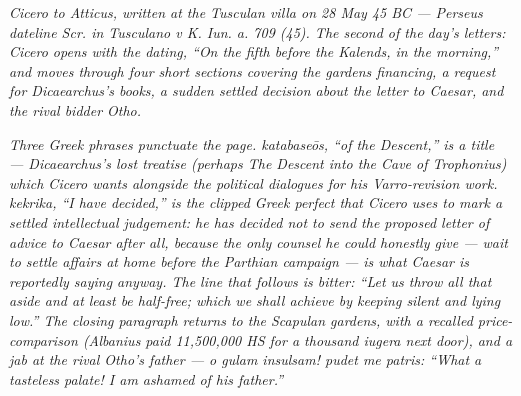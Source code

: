 
\textit{Cicero to Atticus, written at the Tusculan villa on 28 May
45 BC --- Perseus dateline \textit{Scr. in Tusculano v K. Iun. a.
709 (45)}. The second of the day's letters: Cicero opens with the
dating, ``On the fifth before the Kalends, in the morning,'' and
moves through four short sections covering the gardens
financing, a request for Dicaearchus's books, a sudden settled
decision about the letter to Caesar, and the rival bidder Otho.}

\textit{Three Greek phrases punctuate the page. \textit{katabaseōs},
``of the \textit{Descent},'' is a title --- Dicaearchus's lost
treatise (perhaps \textit{The Descent into the Cave of Trophonius})
which Cicero wants alongside the political dialogues for his
Varro-revision work. \textit{kekrika}, ``I have decided,'' is the
clipped Greek perfect that Cicero uses to mark a settled
intellectual judgement: he has decided not to send the proposed
letter of advice to Caesar after all, because the only counsel he
could honestly give --- wait to settle affairs at home before the
Parthian campaign --- is what Caesar is reportedly saying anyway.
The line that follows is bitter: ``Let us throw all that aside
and at least be half-free; which we shall achieve by keeping
silent and lying low.'' The closing paragraph returns to the
Scapulan gardens, with a recalled price-comparison (Albanius paid
11,500,000 HS for a thousand iugera next door), and a jab at the
rival Otho's father --- \textit{o gulam insulsam! pudet me
patris}: ``What a tasteless palate! I am ashamed of his father.''}
